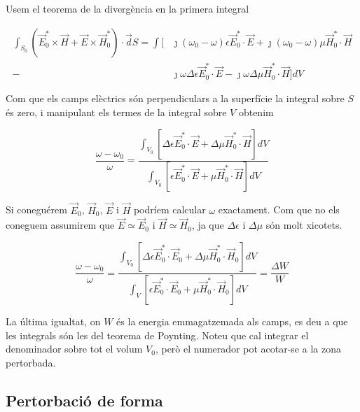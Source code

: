 Usem el teorema de la divergència en la primera integral

\begin{equation}
  \begin{aligned}
  \int _{S_0}  (\vec E_0 ^* \times \vec H + \vec E \times \vec H_0 ^*) \cdot \vec dS = \int \bigg [ &\jmath ( \omega_0 - \omega) \epsilon \vec E_0 ^* \cdot \vec E + \jmath (\omega_0 - \omega) \mu \vec H_0 ^* \cdot \vec H \\
  - &\jmath \omega \Delta \epsilon \vec E _0 ^* \cdot \vec E - \jmath \omega \Delta \mu \vec H_0 ^ * \cdot \vec H \bigg ] dV \label{integral}
  \end{aligned}
\end{equation}

Com que els camps elèctrics són perpendiculars a la superfície la integral sobre $S$ és zero, i manipulant els termes de la integral sobre $V$ obtenim

\begin{equation}
  \frac{\omega - \omega _0}{\omega} = \frac{\int _{V_0} \left [ \Delta \epsilon \vec E_0 ^* \cdot \vec E + \Delta \mu \vec H_0 ^* \cdot \vec H \right ] dV}{\int _{V_0} \left [ \epsilon \vec E _0 ^ * \cdot \vec E + \mu \vec H_0 ^* \cdot \vec H \right] dV}
\end{equation}

Si coneguérem $\vec E_0$, $\vec H_0$, $\vec E$ i $\vec H$ podríem calcular $\omega$ exactament. Com que no els coneguem assumirem  que $\vec E \simeq \vec E_0$ i $\vec H \simeq \vec H_0$, ja que $\Delta \epsilon$ i $\Delta \mu$ són molt xicotets.

\begin{equation}
  \frac{\omega - \omega _0}{\omega} = \frac{\int _{V_0} \left [ \Delta \epsilon \vec E_0 ^* \cdot \vec E_0 + \Delta \mu \vec H_0 ^* \cdot \vec H_0 \right ] dV}{\int _{V} \left [ \epsilon \vec E_0 ^ * \cdot \vec E_0 + \mu \vec H_0 ^* \cdot \vec H_0 \right] dV} = \frac{\Delta W}{W}
\end{equation}

La última igualtat, on $W$ és la energia emmagatzemada als camps, es deu a que les integrals són les del teorema de Poynting. Noteu que cal integrar el denominador sobre tot el volum $V_0$, però el numerador pot acotar-se a la zona pertorbada.

\subsection{Pertorbació de forma}

